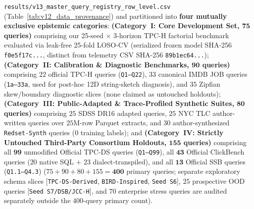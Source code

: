 \documentclass[10pt,a4paper]{article}
\begin{document}
\texttt{results/\allowbreak{}v13\_\allowbreak{}master\_\allowbreak{}query\_\allowbreak{}registry\_\allowbreak{}row\_\allowbreak{}level.csv} (Table~\ref{tab:v12_data_provenance}) and partitioned into \textbf{four mutually exclusive epistemic categories}: \textbf{(Category~I: Core Development Set, $\mathbf{75}$ queries)} comprising our 25-seed $\times$ 3-horizon TPC-H factorial benchmark evaluated via leak-free 25-fold LOSO-CV (serialized frozen model SHA-256 \texttt{f0e5f17c...}, distinct from telemetry CSV SHA-256 \texttt{89b1ec64...}); \textbf{(Category~II: Calibration \& Diagnostic Benchmarks, $\mathbf{90}$ queries)} comprising $22$ official TPC-H queries (\texttt{Q1--Q22}), $33$ canonical IMDB JOB queries (\texttt{1a--33a}, used for post-hoc 12D string-sketch diagnosis), and $35$ Zipfian skew/boundary diagnostic slices (none claimed as untouched holdouts); \textbf{(Category~III: Public-Adapted \& Trace-Profiled Synthetic Suites, $\mathbf{80}$ queries)} comprising $25$ SDSS DR16 adapted queries, $25$ NYC TLC author-written queries over $25\text{M}$-row Parquet extracts, and $30$ author-synthesized \texttt{Redset-Synth} queries ($0$ training labels); and \textbf{(Category~IV: Strictly Untouched Third-Party Consortium Holdouts, $\mathbf{155}$ queries)} comprising all $\mathbf{99}$ unmodified Official TPC-DS queries (\texttt{Q1--Q99}), all $\mathbf{43}$ Official ClickBench queries ($20$ native SQL $+$ $23$ dialect-transpiled), and all $\mathbf{13}$ Official SSB queries (\texttt{Q1.1--Q4.3}) ($75 + 90 + 80 + 155 = \mathbf{400}$ primary queries; separate exploratory schema slices [\texttt{TPC-DS-Derived}, \texttt{BIRD-Inspired}, \texttt{Seed~S6}], $25$ prospective OOD queries [\texttt{Seed~S7/DSB/JCC-H}], and $70$ enterprise stress queries are audited separately outside the $400$-query primary count).
\end{document}
